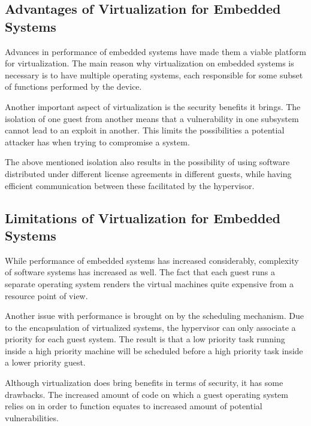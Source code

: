 \subsection{Advantages of Virtualization for Embedded Systems}
\label{subsec:advvirt}

Advances in performance of embedded systems have made them a viable platform for virtualization. The main reason why virtualization on embedded systems is necessary is to have multiple operating systems, each responsible for some subset of functions performed by the device.

Another important aspect of virtualization is the security benefits it brings. The isolation of one guest from another means that a vulnerability in one subsystem cannot lead to an exploit in another. This limits the possibilities a potential attacker has when trying to compromise a system.

The above mentioned isolation also results in the possibility of using software distributed under different license agreements in different guests, while having efficient communication between these facilitated by the hypervisor.

\subsection{Limitations of Virtualization for Embedded Systems}
\label{subsec:limitvirt}

While performance of embedded systems has increased considerably, complexity of software systems has increased as well. The fact that each guest runs a separate operating system renders the virtual machines quite expensive from a resource point of view.

Another issue with performance is brought on by the scheduling mechanism. Due to the encapsulation of virtualized systems, the hypervisor can only associate a priority for each guest system. The result is that a low priority task running inside a high priority machine will be scheduled before a high priority task inside a lower priority guest.

Although virtualization does bring benefits in terms of security, it has some drawbacks. The increased amount of code on which a guest operating system relies on in order to function equates to increased amount of potential vulnerabilities.
